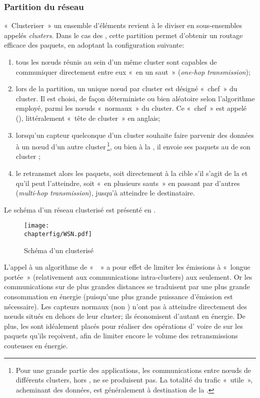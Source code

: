         \subsubsection{Partition du réseau}
«~Clusteriser~» un ensemble d'éléments revient à le diviser en sous-ensembles appelés \textit{clusters}.
Dans le cas des \rcsfs, cette partition permet d'obtenir un routage efficace des paquets, en adoptant la configuration suivante:
\begin{enumerate}
    \item tous les nœuds réunis au sein d'un même cluster sont capables de communiquer directement entre eux « en un saut » (\textit{one-hop transmission});
    \item lors de la partition, un unique nœud par cluster est désigné «~chef~» du cluster.
        Il est choisi, de façon déterministe ou bien aléatoire selon l'algorithme employé, parmi les nœuds «~normaux~» du cluster.
        Ce «~chef~» est appelé \textit{\ch} (\CH), littéralement « tête de cluster » en anglais;
    \item lorsqu'un capteur quelconque d'un cluster souhaite faire parvenir des données à un nœud d'un autre cluster\,\footnote{Pour une grande partie des applications, les communications entre nœuds de différents clusters, hors \chs, ne se produisent pas. La totalité du trafic «~utile~», acheminant des données, est généralement à destination de la \sdb.}, ou bien à la \sdb, il envoie ses paquets au \ch de son cluster ;
    \item le \ch retransmet alors les paquets, soit directement à la cible s'il s'agit de la \sdb et qu'il peut l'atteindre, soit « en plusieurs sauts » en passant par d'autres \chs (\textit{multi-hop transmission}), jusqu'à atteindre le destinataire.
\end{enumerate}
Le schéma d'un réseau clusterisé est présenté en .
\begin{figure}[!ht]
    \centering
    \texttt{[image: \\chapterfig/WSN.pdf]}
    \caption{Schéma d'un \rc clusterisé}\label{st:fig:wsn}
\end{figure}

L'appel à un algorithme de «  » a pour effet de limiter les émissions à «~longue portée~» (relativement aux communications intra-clusters) aux \chs seulement.
Or les communications sur de plus grandes distances se traduisent par une plus grande consommation en énergie (puisqu'une plus grande puissance d'émission est nécessaire).
Les capteurs normaux (non \chs) n'ont pas à atteindre directement des nœuds situés en dehors de leur cluster; ils économisent d'autant en énergie.
De plus, les \chs sont idéalement placés pour réaliser des opérations d' voire de  sur les paquets qu'ils reçoivent, afin de limiter encore le volume des retransmissions couteuses en énergie.

